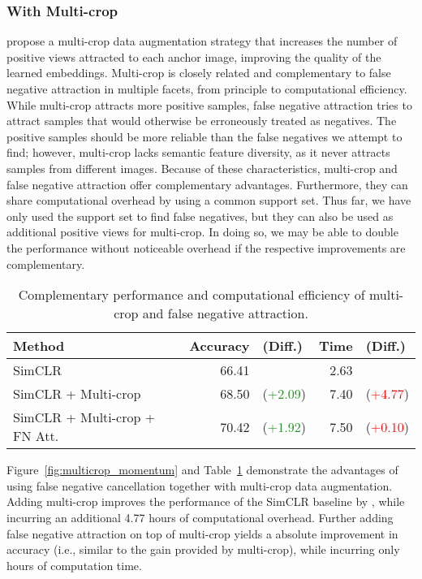 \documentclass[10pt,twocolumn,letterpaper]{article}
\begin{document}
\vspace{-5pt}
\subsubsection{With Multi-crop}

\citet{caron2020unsupervised} propose a multi-crop data augmentation strategy that increases the number of positive views attracted to each anchor image, improving the quality of the learned embeddings. Multi-crop is closely related and complementary to false negative attraction in multiple facets, from principle to computational efficiency. While multi-crop attracts more positive samples, false negative attraction tries to attract samples that would otherwise be erroneously treated as negatives. The positive samples should be more reliable than the false negatives we attempt to find; however, multi-crop lacks semantic feature diversity, as it never attracts samples from different images. Because of these characteristics, multi-crop and false negative attraction offer complementary advantages. Furthermore, they can share computational overhead by using a common support set. Thus far, we have only used the support set to find false negatives, but they can also be used as additional positive views for multi-crop. In doing so, we may be able to double the performance without noticeable overhead if the respective improvements are complementary.

\begin{table}[!t]
    \centering
    {\footnotesize
    \begin{tabularx}{\linewidth}{Xr@{ }lr@{ }l}
    \toprule
    Method & Accuracy & (Diff.) & Time & (Diff.)\\
    \midrule
    SimCLR & 66.41 & & 2.63 & \\
    SimCLR + Multi-crop &  68.50 & (\textcolor{ForestGreen}{+2.09}) &  7.40 & (\textcolor{red}{+4.77})\\
    SimCLR + Multi-crop + FN Att.\ &  70.42 & (\textcolor{ForestGreen}{+1.92}) & 7.50 & (\textcolor{red}{+0.10})\\
    \bottomrule
    \end{tabularx}}
    \vspace{3pt}
    \caption{Complementary performance and computational efficiency of multi-crop and false negative attraction.} \label{tab:efficiency}
\end{table}
Figure~\ref{fig:multicrop_momentum} and Table~\ref{tab:efficiency} demonstrate the advantages of using false negative cancellation together with multi-crop data augmentation. Adding multi-crop improves the performance of the SimCLR baseline by , while incurring an additional 4.77 hours of computational overhead. Further adding false negative attraction on top of multi-crop yields a  absolute improvement in accuracy (i.e., similar to the  gain provided by multi-crop), while incurring only  hours of computation time.
\end{document}
